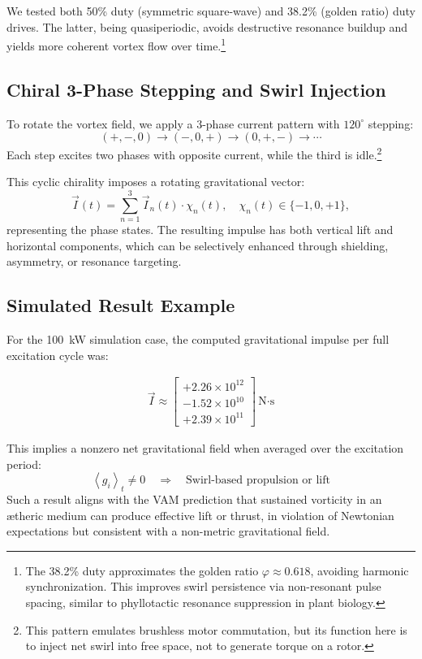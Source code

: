 \documentclass[twocolumn,aps,pre,floatfix,nofootinbib]{revtex4-2}
\begin{document}
We tested both 50\% duty (symmetric square-wave) and 38.2\% (golden ratio) duty drives. The latter, being quasiperiodic, avoids destructive resonance buildup and yields more coherent vortex flow over time.\footnote{%
    The 38.2\% duty approximates the golden ratio \( \varphi \approx 0.618 \), avoiding harmonic synchronization. This improves swirl persistence via non-resonant pulse spacing, similar to phyllotactic resonance suppression in plant biology.%
}

\subsection*{Chiral 3-Phase Stepping and Swirl Injection}

To rotate the vortex field, we apply a 3-phase current pattern with $120^\circ$ stepping:
\[
    (+, -, 0) \rightarrow (-, 0, +) \rightarrow (0, +, -) \rightarrow \cdots
\]
Each step excites two phases with opposite current, while the third is idle.\footnote{%
    This pattern emulates brushless motor commutation, but its function here is to inject net swirl into free space, not to generate torque on a rotor.%
}

This cyclic chirality imposes a rotating gravitational vector:
\[
    \vec{I}(t) = \sum_{n=1}^3 \vec{I}_n(t) \cdot \chi_n(t), \quad \chi_n(t) \in \{-1, 0, +1\},
\]
representing the phase states. The resulting impulse has both vertical lift and horizontal components, which can be selectively enhanced through shielding, asymmetry, or resonance targeting.

\subsection*{Simulated Result Example}

For the 100~kW simulation case, the computed gravitational impulse per full excitation cycle was:

\[
    \begin{array}{c}
        \boxed{
            \vec{I} \approx
            \begin{bmatrix}
                +2.26 \times 10^{12} \\
                -1.52 \times 10^{10} \\
                +2.39 \times 10^{11}
            \end{bmatrix}
            \, \text{N·s}
        }
    \end{array}
\]

This implies a nonzero net gravitational field when averaged over the excitation period:
\[
    \boxed{
        \left< g_i \right>_t \neq 0 \quad \Rightarrow \quad \text{Swirl-based propulsion or lift}
    }
\]
Such a result aligns with the VAM prediction that sustained vorticity in an ætheric medium can produce effective lift or thrust, in violation of Newtonian expectations but consistent with a non-metric gravitational field.
\end{document}

